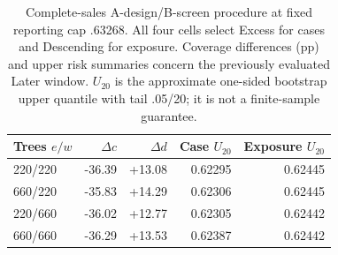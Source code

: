 \begin{table}[t]\centering\small
\caption{Complete-sales A-design/B-screen procedure at fixed reporting cap .63268. All four cells select Excess for cases and Descending for exposure. Coverage differences (pp) and upper risk summaries concern the previously evaluated Later window. $U_{20}$ is the approximate one-sided bootstrap upper quantile with tail .05/20; it is not a finite-sample guarantee.}\label{tab:v7-screen-main}
\begin{tabular}{lrrrr}\toprule
Trees $e/w$ & $\Delta c$ & $\Delta d$ & Case $U_{20}$ & Exposure $U_{20}$\\\midrule
220/220 & -36.39 & +13.08 & 0.62295 & 0.62445 \\
660/220 & -35.83 & +14.29 & 0.62306 & 0.62445 \\
220/660 & -36.02 & +12.77 & 0.62305 & 0.62442 \\
660/660 & -36.29 & +13.53 & 0.62387 & 0.62442 \\
\bottomrule\end{tabular}\end{table}
